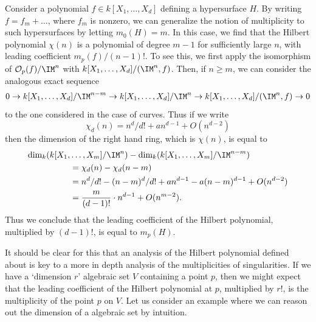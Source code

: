 \begin{example}
    Consider a polynomial $f \in k[X_1, \dots, X_d]$ defining a hypersurface $H$. By writing $f = f_m + \dots$, where $f_m$ is nonzero, we can generalize the notion of multiplicity to such hypersurfaces by letting $m_0(H) = m$. In this case, we find that the Hilbert polynomial $\chi(n)$ is a polynomial of degree $m-1$ for sufficiently large $n$, with leading coefficient $m_p(f)/(n-1)!$. To see this, we first apply the isomorphism of $\mathcal{O}_p(f)/\IM^n$ with $k[X_1, \dots, X_d]/(\IM^n,f)$. Then, if $n \geq m$, we can consider the analogous exact sequence
    \[ 0 \to k[X_1, \dots, X_d]/\IM^{n-m} \to k[X_1, \dots, X_d]/\IM^n \to k[X_1, \dots, X_d]/(\IM^n, f) \to 0 \]
    to the one considered in the case of curves. Thus if we write
    \[ \chi_d(n) = n^d/d! + an^{d-1} + O(n^{d-2}) \]
    then the dimension of the right hand ring, which is $\chi(n)$, is equal to
    \begin{align*}
        \dim_k(k[X_1,& \dots, X_m]/\IM^n) - \dim_k(k[X_1, \dots, X_m]/\IM^{n-m})\\
        &= \chi_d(n) - \chi_d(n-m)\\
        &= n^d/d! - (n-m)^d/d! + an^{d-1} - a(n-m)^{d-1} + O(n^{d-2})\\
        &= \frac{m}{(d-1)!} \cdot n^{d-1} + O(n^{m-2}).
    \end{align*}
    Thus we conclude that the leading coefficient of the Hilbert polynomial, multiplied by $(d-1)!$, is equal to $m_p(H)$.
\end{example}

It should be clear for this that an analysis of the Hilbert polynomial defined about is key to a more in depth analysis of the multiplicities of singularities. If we have a `dimension $r$' algebraic set $V$ containing a point $p$, then we might expect that the leading coefficient of the Hilbert polynomial at $p$, multiplied by $r!$, is the multiplicity of the point $p$ on $V$. Let us consider an example where we can reason out the dimension of a algebraic set by intuition.

